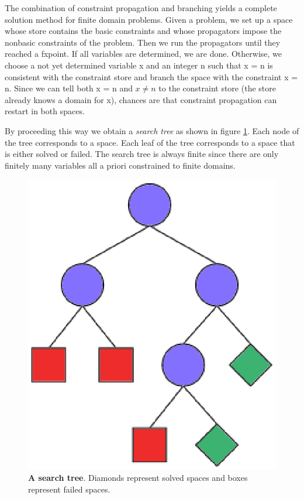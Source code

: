\documentclass[a4paper,halfparskip]{scrartcl}
\begin{document}
The combination of constraint propagation and branching 
yields a complete solution method 
for finite domain problems. Given a problem, we set up a 
space whose store contains the basic 
constraints and whose propagators impose the nonbasic 
constraints of the problem. Then we run 
the propagators until they reached a fxpoint. If all 
variables are determined, we are done. 
Otherwise, we choose a not yet determined variable x 
and an integer n such that x = n is consistent 
with the constraint store and branch the space 
with the constraint x = n. Since we can tell both 
x = n and $ x \neq n $ to the constraint store (the store 
already knows a domain for x), chances are 
that constraint propagation can restart in both spaces.

By proceeding this way we obtain a \emph{search tree} as
shown in figure \ref{figure2}. Each node of the tree 
corresponds to a space. Each leaf of the tree corresponds 
to a space that is either solved or failed. 
The search tree is always finite since there are only 
finitely many variables all a priori constrained 
to finite domains.

\begin{figure}[htpb]

\centerline{\includegraphics*[scale=0.5]{figs/search-tree.eps}}
\caption{\textbf{A search tree}. Diamonds represent solved spaces 
and boxes represent failed spaces.}
\label{figure2}
\end{figure}
\end{document}
